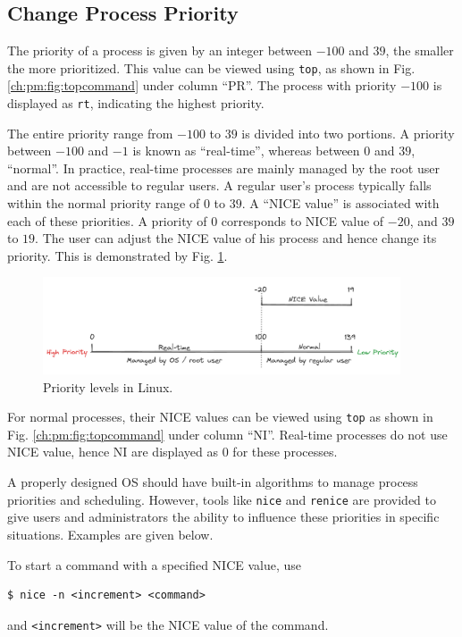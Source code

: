 \subsection{Change Process Priority}

The priority of a process is given by an integer between $-100$ and $39$, the smaller the more prioritized. This value can be viewed using \verb|top|, as shown in Fig. \ref{ch:pm:fig:topcommand} under column ``PR''. The process with priority $-100$ is displayed as \verb|rt|, indicating the highest priority.

The entire priority range from $-100$ to $39$ is divided into two portions. A priority between $-100$ and $-1$ is known as ``real-time'', whereas between $0$ and $39$, ``normal''. In practice, real-time processes are mainly managed by the root user and are not accessible to regular users. A regular user's process typically falls within the normal priority range of $0$ to $39$. A ``NICE value'' is associated with each of these priorities. A priority of $0$ corresponds to NICE value of $-20$, and $39$ to $19$. The user can adjust the NICE value of his process and hence change its priority. This is demonstrated by Fig. \ref{ch:pm:fig:priority}.

\begin{figure}[htbp]
	\centering
	\includegraphics[width=300pt]{chapters/part-1/figures/priority.png}
	\caption{Priority levels in Linux.} \label{ch:pm:fig:priority}
\end{figure}

For normal processes, their NICE values can be viewed using \verb|top| as shown in Fig. \ref{ch:pm:fig:topcommand} under column ``NI''. Real-time processes do not use NICE value, hence NI are displayed as $0$ for these processes.

A properly designed OS should have built-in algorithms to manage process priorities and scheduling. However, tools like \verb|nice| and \verb|renice| are provided to give users and administrators the ability to influence these priorities in specific situations. Examples are given below.

To start a command with a specified NICE value, use
\begin{lstlisting}
$ nice -n <increment> <command>
\end{lstlisting}
and \verb|<increment>| will be the NICE value of the command.

